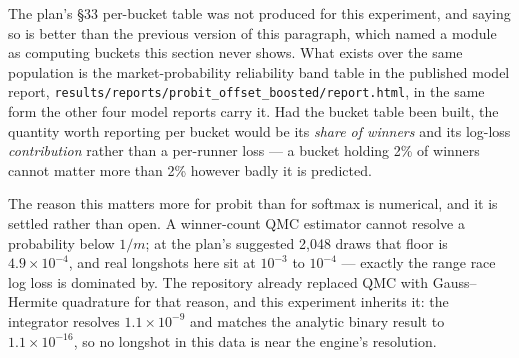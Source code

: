 The plan's §33 per-bucket table was not produced for this experiment, and saying so is better than the previous version of this paragraph, which named a module as computing buckets this section never shows. What exists over the same population is the market-probability reliability band table in the published model report, \texttt{results/reports/probit\_offset\_boosted/report.html}, in the same form the other four model reports carry it. Had the bucket table been built, the quantity worth reporting per bucket would be its \emph{share of winners} and its log-loss \emph{contribution} rather than a per-runner loss --- a bucket holding 2\% of winners cannot matter more than 2\% however badly it is predicted.

The reason this matters more for probit than for softmax is numerical, and it is settled rather than open. A winner-count QMC estimator cannot resolve a probability below $1/m$; at the plan's suggested 2,048 draws that floor is $4.9\times10^{-4}$, and real longshots here sit at $10^{-3}$ to $10^{-4}$ --- exactly the range race log loss is dominated by. The repository already replaced QMC with Gauss--Hermite quadrature for that reason, and this experiment inherits it: the integrator resolves $1.1\times10^{-9}$ and matches the analytic binary result to $1.1\times10^{-16}$, so no longshot in this data is near the engine's resolution.
